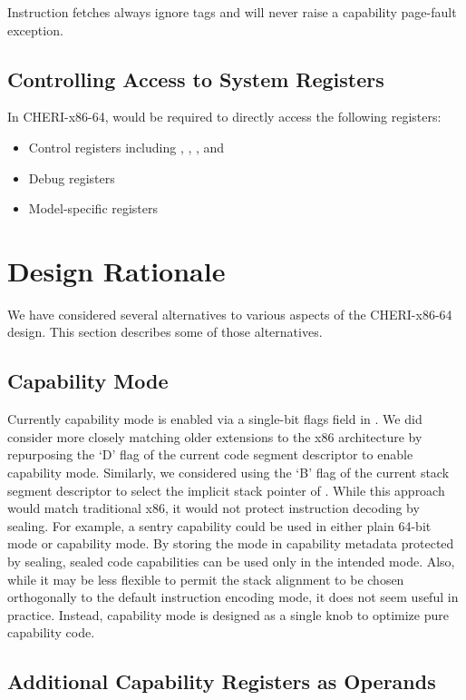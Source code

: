 Instruction fetches always ignore tags and will never raise a
capability page-fault exception.

\subsection{Controlling Access to System Registers}

In CHERI-x86-64, \cappermASR{} would be required to directly access the
following registers:

\begin{itemize}
  \item Control registers including \KCC{}, \KSC{}, \CSTAR{}, and \KGS{}
  \item Debug registers
  \item Model-specific registers
\end{itemize}

\section{Design Rationale}

We have considered several alternatives to various aspects of the
CHERI-x86-64 design.  This section describes some of those
alternatives.

\subsection{Capability Mode}

Currently capability mode is enabled via a single-bit flags field in
\CIP{}.  We did consider more closely matching older extensions to the
x86 architecture by repurposing the `D' flag of the current code
segment descriptor to enable capability mode.  Similarly, we
considered using the `B' flag of the current stack segment descriptor
to select the implicit stack pointer of \CSP{}.  While this approach
would match traditional x86, it would not protect instruction decoding
by sealing.  For example, a sentry capability could be used in either
plain 64-bit mode or capability mode.  By storing the mode in
capability metadata protected by sealing, sealed code capabilities can
be used only in the intended mode.  Also, while it may be less
flexible to permit the stack alignment to be chosen orthogonally to the
default instruction encoding mode, it does not seem useful in
practice.  Instead, capability mode is designed as a single knob to
optimize pure capability code.

\subsection{Additional Capability Registers as Operands}


